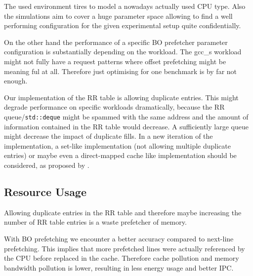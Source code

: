\documentclass[conference]{IEEEtran}
\begin{document}
The used environment tires to model a nowadays actually used CPU type.
Also the simulations aim to cover a huge parameter space allowing to find a well performing configuration for the given experimental setup quite confidentially.

On the other hand the performance of a specific BO prefetcher parameter configuration is substantially depending on the workload.
The gcc\_s workload might not fully have a request patterns where offset prefetching might be meaning ful at all.
Therefore just optimising for one benchmark is by far not enough.





Our implementation of the RR table is allowing duplicate entries.
This might degrade performance on specific workloads dramatically, because the RR queue/\texttt{std::deque} might be spammed with the same address
and the amount of information contained in the RR table would decrease.
A sufficiently large queue might decrease the impact of duplicate fills.
In a new iteration of the implementation, a set-like implementation (not allowing multiple duplicate entries) or maybe even a direct-mapped cache like implementation should be considered, as proposed by \cite[section 4.4]{BOP_2016}.



\subsection{Resource Usage}

Allowing duplicate entries in the RR table and therefore maybe increasing the number of RR table entries is a waste prefetcher of memory.

With BO prefetching we encounter a better accuracy compared to next-line prefetching.
This implies that more prefetched lines were actually referenced by the CPU before replaced in the cache.
Therefore cache pollution and memory bandwidth pollution is lower, resulting in less energy usage and better IPC.
\end{document}
